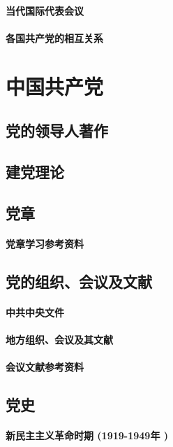 \documentclass[UTF8]{../RepresentationUniverse}
\begin{document}
    \subsubsection{当代国际代表会议}
    \subsubsection{各国共产党的相互关系}
    





\chapter{中国共产党}
\section{党的领导人著作}
\section{建党理论}
\section{党章}
    \subsubsection{党章学习参考资料}

\section{党的组织、会议及文献}
    \subsubsection{中共中央文件}
    \subsubsection{地方组织、会议及其文献}
    \subsubsection{会议文献参考资料}

\section{党史}
    \subsubsection{新民主主义革命时期 (1919-1949年 )}
\end{document}
